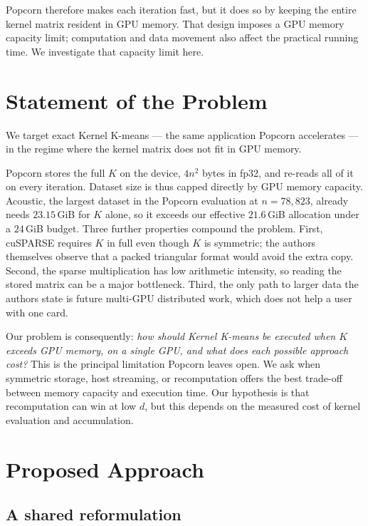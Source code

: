 \documentclass[sigconf]{acmart}
\begin{document}
Popcorn therefore makes each iteration fast, but it does so by keeping the
entire kernel matrix resident in GPU memory. That design imposes a GPU memory
capacity limit; computation and data movement also affect the practical running
time. We investigate that capacity limit here.

\section{Statement of the Problem}

We target exact Kernel K-means --- the same application Popcorn
accelerates --- in the regime where the kernel matrix does not fit in GPU
memory.

Popcorn stores the full $K$ on the device, $4n^2$ bytes in fp32, and re-reads
all of it on every iteration. Dataset size is thus capped directly by GPU
memory capacity. Acoustic, the largest dataset in the Popcorn evaluation at
$n = 78{,}823$, already needs $23.15$\,GiB for $K$ alone, so it exceeds our
effective $21.6$\,GiB allocation under a $24$\,GiB budget. Three further
properties compound the problem. First, cuSPARSE requires $K$ in full even
though $K$ is symmetric; the authors themselves observe that a packed
triangular format would avoid the extra copy. Second, the sparse multiplication
has low arithmetic intensity, so reading the stored matrix can be a major
bottleneck. Third, the only path to larger data the authors state is future
multi-GPU distributed work, which does not help a user with one card.

Our problem is consequently: \emph{how should Kernel K-means be executed when
$K$ exceeds GPU memory, on a single GPU, and what does each possible approach
cost?} This is the principal limitation Popcorn leaves open. We ask when
symmetric storage, host streaming, or recomputation offers the best trade-off
between memory capacity and execution time. Our hypothesis is that
recomputation can win at low $d$, but this depends on the measured cost of
kernel evaluation and accumulation.

\section{Proposed Approach}

\subsection{A shared reformulation}
\end{document}
